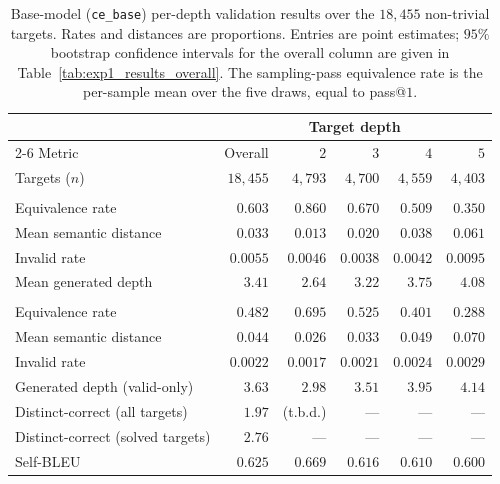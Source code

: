 \documentclass[titlepage,a4paper,11pt]{report}
\begin{document}
    \begin{table}[ht]
        \centering
        \caption{Base-model (\texttt{ce\_base}) per-depth validation results over the $18{,}455$ non-trivial targets. Rates and distances are proportions. Entries are point estimates; $95\%$ bootstrap confidence intervals for the overall column are given in Table~\ref{tab:exp1_results_overall}. The sampling-pass equivalence rate is the per-sample mean over the five draws, equal to \textup{pass}@$1$.}
        \label{tab:exp1_results_by_depth}
        \begin{tabular}{lrrrrr}
            \toprule
            & \multicolumn{5}{c}{Target depth} \\
            \cmidrule(l){2-6}
            Metric & Overall & $2$ & $3$ & $4$ & $5$ \\
            \midrule
            Targets ($n$) & $18{,}455$ & $4{,}793$ & $4{,}700$ & $4{,}559$ & $4{,}403$ \\
            \addlinespace
            \multicolumn{6}{l}{\emph{Greedy pass}} \\
            \quad Equivalence rate & $0.603$ & $0.860$ & $0.670$ & $0.509$ & $0.350$ \\
            \quad Mean semantic distance    & $0.033$ & $0.013$ & $0.020$ & $0.038$ & $0.061$ \\
            \quad Invalid rate              & $0.0055$ & $0.0046$ & $0.0038$ & $0.0042$ & $0.0095$ \\
            \quad Mean generated depth      & $3.41$ & $2.64$ & $3.22$ & $3.75$ & $4.08$ \\
            \addlinespace
            \multicolumn{6}{l}{\emph{Sampling pass}} \\
            \quad Equivalence rate & $0.482$ & $0.695$ & $0.525$ & $0.401$ & $0.288$ \\
            \quad Mean semantic distance    & $0.044$ & $0.026$ & $0.033$ & $0.049$ & $0.070$ \\
            \quad Invalid rate              & $0.0022$ & $0.0017$ & $0.0021$ & $0.0024$ & $0.0029$ \\
            \quad Generated depth (valid-only) & $3.63$ & $2.98$ & $3.51$ & $3.95$ & $4.14$ \\
            \quad Distinct-correct (all targets)    & $1.97$ & (t.b.d.) & --- & --- & --- \\
            \quad Distinct-correct (solved targets) & $2.76$ & --- & --- & --- & --- \\
            \quad Self-BLEU                 & $0.625$ & $0.669$ & $0.616$ & $0.610$ & $0.600$ \\
            \bottomrule
        \end{tabular}
    \end{table}
    
\end{document}
